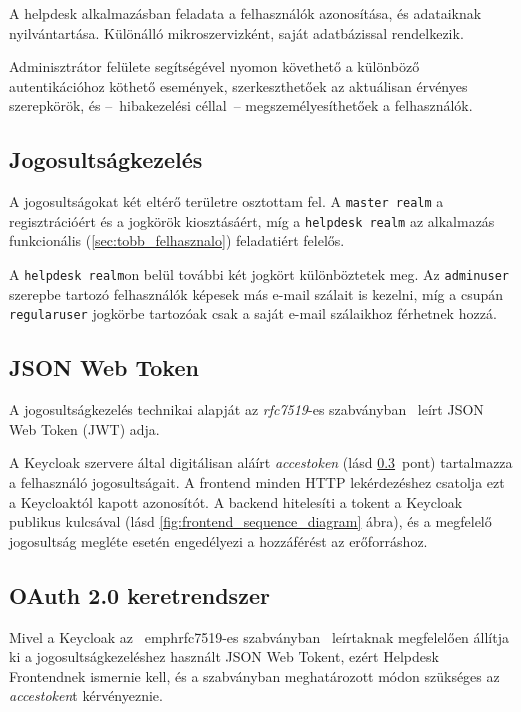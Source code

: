 A helpdesk alkalmazásban feladata a felhasználók azonosítása, és adataiknak nyilvántartása. Különálló mikroszervizként, saját adatbázissal rendelkezik.

Adminisztrátor felülete segítségével nyomon követhető a különböző autentikációhoz köthető események, szerkeszthetőek az aktuálisan érvényes szerepkörök, és --~hibakezelési céllal~-- megszemélyesíthetőek a felhasználók.


\subsection{Jogosultságkezelés}\label{sec:Jogosultságkezelés}
A jogosultságokat két eltérő területre osztottam fel. A \texttt{master realm} a regisztrációért és a jogkörök kiosztásáért, míg a \texttt{helpdesk realm} az alkalmazás funkcionális (\ref{sec:tobb_felhasznalo}) feladatiért felelős.

A \texttt{helpdesk realm}on belül további két jogkört különböztetek meg. Az \texttt{admin\textunderscore user} szerepbe tartozó felhasználók képesek más e-mail szálait is kezelni, míg a csupán \texttt{regular\textunderscore user} jogkörbe tartozóak csak a saját e-mail szálaikhoz férhetnek hozzá.


\subsection{JSON Web Token}\label{sec:JWT}
A jogosultságkezelés technikai alapját az \emph{rfc7519}-es szabványban~\cite{rfc7519_JSON_Web_Token} leírt JSON Web Token (JWT) adja. 

A Keycloak szervere által digitálisan aláírt \emph{acces\textunderscore token} (lásd \ref{sec:oauth_2_0}~pont) tartalmazza a felhasználó jogosultságait. A frontend minden HTTP lekérdezéshez csatolja ezt a Keycloaktól kapott azonosítót. A backend hitelesíti a tokent a Keycloak publikus kulcsával (lásd \ref{fig:frontend_sequence_diagram} ábra), és a megfelelő jogosultság megléte esetén engedélyezi a hozzáférést az erőforráshoz.

\subsection{OAuth 2.0 keretrendszer}\label{sec:oauth_2_0}
Mivel a Keycloak az ~emph{rfc7519}-es szabványban~\cite{rfc6749_OAuth_2_0} leírtaknak megfelelően állítja ki a jogosultságkezeléshez használt JSON Web Tokent, ezért Helpdesk Frontendnek ismernie kell, és a szabványban meghatározott módon szükséges az \emph{acces\textunderscore token}t kérvényeznie.

